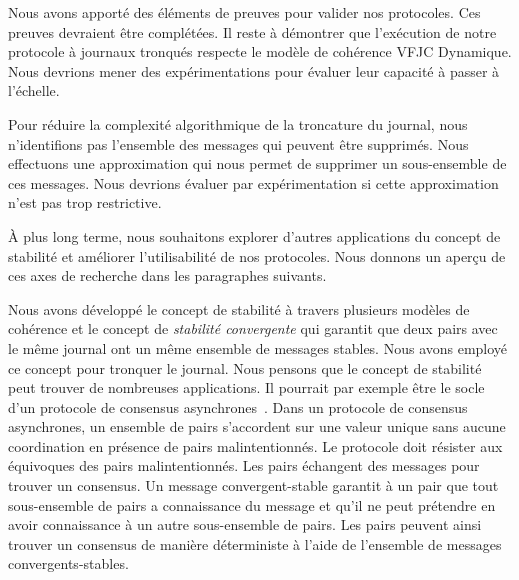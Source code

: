
Nous avons apporté des éléments de preuves pour valider nos protocoles.
Ces preuves devraient être complétées.
Il reste à démontrer que l'exécution de notre protocole à journaux tronqués respecte le modèle de cohérence \acl{VFJC} Dynamique.
Nous devrions mener des expérimentations pour évaluer leur capacité à passer à l'échelle.

Pour réduire la complexité algorithmique de la troncature du journal, nous n'identifions pas l'ensemble des messages qui peuvent être supprimés.
Nous effectuons une approximation qui nous permet de supprimer un sous-ensemble de ces messages.
Nous devrions évaluer par expérimentation si cette approximation n'est pas trop restrictive.

À plus long terme, nous souhaitons explorer d'autres applications du concept de stabilité et améliorer l'utilisabilité de nos protocoles.
Nous donnons un aperçu de ces axes de recherche dans les paragraphes suivants.

Nous avons développé le concept de stabilité à travers plusieurs modèles de cohérence et le concept de \emph{stabilité convergente} qui garantit que deux pairs avec le même journal ont un même ensemble de messages stables.
Nous avons employé ce concept pour tronquer le journal.
Nous pensons que le concept de stabilité peut trouver de nombreuses applications.
Il pourrait par exemple être le socle d'un protocole de consensus asynchrones~\autocite{bracha1985asynchronous}.
Dans un protocole de consensus asynchrones, un ensemble de pairs s'accordent sur une valeur unique sans aucune coordination en présence de pairs malintentionnés.
Le protocole doit résister aux équivoques des pairs malintentionnés.
Les pairs échangent des messages pour trouver un consensus.
Un message convergent-stable garantit à un pair que tout sous-ensemble de pairs a connaissance du message et qu'il ne peut prétendre en avoir connaissance à un autre sous-ensemble de pairs.
Les pairs peuvent ainsi trouver un consensus de manière déterministe à l'aide de l'ensemble de messages convergents-stables.


